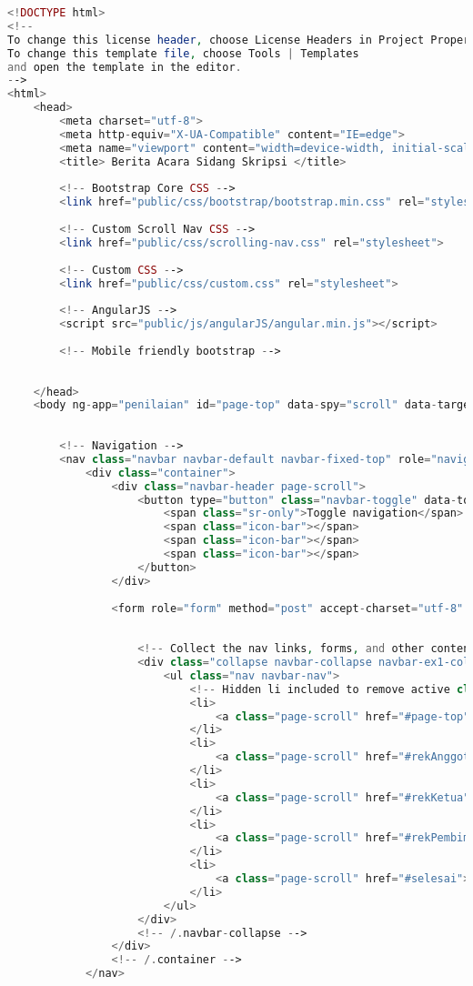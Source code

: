 \begin{lstlisting}[language=PHP,basicstyle=\tiny,caption=skripsi.php]
<!DOCTYPE html>
<!--
To change this license header, choose License Headers in Project Properties.
To change this template file, choose Tools | Templates
and open the template in the editor.
-->
<html>
	<head>
		<meta charset="utf-8">
		<meta http-equiv="X-UA-Compatible" content="IE=edge">
		<meta name="viewport" content="width=device-width, initial-scale=1">
		<title> Berita Acara Sidang Skripsi </title>
		
		<!-- Bootstrap Core CSS -->
		<link href="public/css/bootstrap/bootstrap.min.css" rel="stylesheet">
		
		<!-- Custom Scroll Nav CSS -->
		<link href="public/css/scrolling-nav.css" rel="stylesheet">
		
		<!-- Custom CSS -->
		<link href="public/css/custom.css" rel="stylesheet">
		
		<!-- AngularJS -->
		<script src="public/js/angularJS/angular.min.js"></script>
		
		<!-- Mobile friendly bootstrap -->
		
		
	</head>
	<body ng-app="penilaian" id="page-top" data-spy="scroll" data-target=".navbar-fixed-top">
	
	
		<!-- Navigation -->
		<nav class="navbar navbar-default navbar-fixed-top" role="navigation">
			<div class="container">
				<div class="navbar-header page-scroll">
					<button type="button" class="navbar-toggle" data-toggle="collapse" data-target=".navbar-ex1-collapse">
						<span class="sr-only">Toggle navigation</span>
						<span class="icon-bar"></span>
						<span class="icon-bar"></span>
						<span class="icon-bar"></span>
					</button>
				</div>
				
				<form role="form" method="post" accept-charset="utf-8" action="<?php echo base_url() . "index.php/c_skripsi/tambahDataMahasiswa" ?>" ng-controller="DefaultValue">
					
					
					<!-- Collect the nav links, forms, and other content for toggling -->
					<div class="collapse navbar-collapse navbar-ex1-collapse">
						<ul class="nav navbar-nav">
							<!-- Hidden li included to remove active class from about link when scrolled up past about section -->
							<li>
								<a class="page-scroll" href="#page-top">Berita Acara Sidang Skripsi</a>
							</li>
							<li>
								<a class="page-scroll" href="#rekAnggota">Lembar Rekapitulasi Anggota Tim Penguji</a>
							</li>
							<li>
								<a class="page-scroll" href="#rekKetua">Lembar Rekapitulasi Ketua Tim Penguji</a>
							</li>
							<li>
								<a class="page-scroll" href="#rekPembimbing">Lembar Rekapitulasi Pembimbing</a>
							</li>
							<li>
								<a class="page-scroll" href="#selesai">Selesai</a>
							</li>
						</ul>
					</div>
					<!-- /.navbar-collapse -->
				</div>
				<!-- /.container -->
			</nav>
			

\end{lstlisting}
